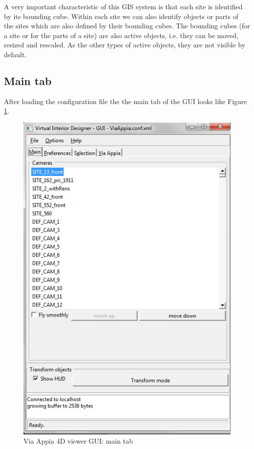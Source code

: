 \documentclass[a4paper,11pt]{article}
\begin{document}
A very important characteristic of this GIS system is that each site is identified by its bounding cube. Within each site we can also identify objects or parts of the sites which are also defined by their bounding cubes. The bounding cubes (for a site or for the parts of a site) are also active objects, i.e. they can be moved, resized and rescaled. As the other types of active objects, they are not visible by default.

\subsection{Main tab}

After loading the configuration file the the main tab of the GUI looks like Figure \ref{fig-guimain}. 

\begin{figure}[!ht]
\centering
\includegraphics[scale=0.5]{fig/main}
\caption{Via Appia 4D viewer GUI: main tab}
\label{fig-guimain}
\end{figure}
\end{document}
